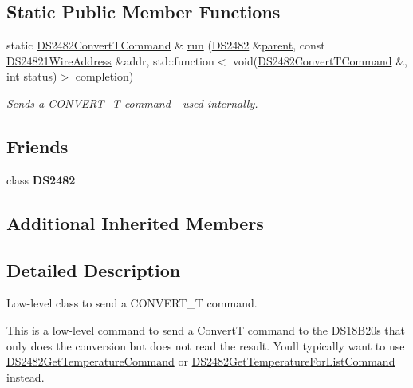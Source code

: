 \subsection*{Static Public Member Functions}
\begin{DoxyCompactItemize}
\item 
static \mbox{\hyperlink{class_d_s2482_convert_t_command}{D\+S2482\+Convert\+T\+Command}} \& \mbox{\hyperlink{class_d_s2482_convert_t_command_a81579d588ee79fadc7c41cd0bcea37f5}{run}} (\mbox{\hyperlink{class_d_s2482}{D\+S2482}} \&\mbox{\hyperlink{class_d_s2482_command_a54a41fb8a610ef2077f5e5377771aaf3}{parent}}, const \mbox{\hyperlink{class_d_s24821_wire_address}{D\+S24821\+Wire\+Address}} \&addr, std\+::function$<$ void(\mbox{\hyperlink{class_d_s2482_convert_t_command}{D\+S2482\+Convert\+T\+Command}} \&, int status)$>$ completion)
\begin{DoxyCompactList}\small\item\em Sends a C\+O\+N\+V\+E\+R\+T\+\_\+T command -\/ used internally. \end{DoxyCompactList}\end{DoxyCompactItemize}
\subsection*{Friends}
\begin{DoxyCompactItemize}
\item 
\mbox{\label{class_d_s2482_convert_t_command_afeaf69274324e8dbeebede05c02d9c18}} 
class {\bfseries D\+S2482}
\end{DoxyCompactItemize}
\subsection*{Additional Inherited Members}


\subsection{Detailed Description}
Low-\/level class to send a C\+O\+N\+V\+E\+R\+T\+\_\+T command. 

This is a low-\/level command to send a ConvertT command to the D\+S18\+B20s that only does the conversion but does not read the result. You\textquotesingle{}ll typically want to use \mbox{\hyperlink{class_d_s2482_get_temperature_command}{D\+S2482\+Get\+Temperature\+Command}} or \mbox{\hyperlink{class_d_s2482_get_temperature_for_list_command}{D\+S2482\+Get\+Temperature\+For\+List\+Command}} instead.

